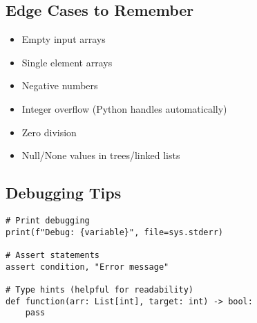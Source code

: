\subsection{Edge Cases to Remember}
\begin{itemize}
    \item Empty input arrays
    \item Single element arrays
    \item Negative numbers
    \item Integer overflow (Python handles automatically)
    \item Zero division
    \item Null/None values in trees/linked lists
\end{itemize}

\subsection{Debugging Tips}
\begin{verbatim}
# Print debugging
print(f"Debug: {variable}", file=sys.stderr)

# Assert statements
assert condition, "Error message"

# Type hints (helpful for readability)
def function(arr: List[int], target: int) -> bool:
    pass
\end{verbatim}

%
